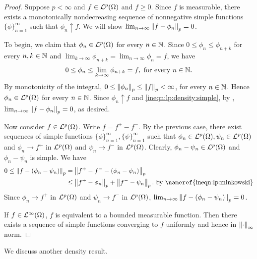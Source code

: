 \begin{proof}

Suppose $p < \infty$ and $f \in {\mathcal {L}^p}(\Omega)$ and $f \geq 0$. Since $f$ is measurable, there exists a monotonically nondecreasing sequence of nonnegative simple functions $\{ \phi \}_{n=1}^{\infty}$ such that $\phi_n \uparrow f$. We will show $\lim_{n \to \infty} \left\lVert f - \phi_n\right\rVert_p = 0$. 

To begin, we claim that $\phi_n \in {\mathcal {L}^p}(\Omega)$ for every $n \in {\mathbb N}$.
Since $0 \leq \phi_{n} \leq \phi_{n + k}$ for every $n, k \in {\mathbb N}$ and $\lim_{k \to \infty} \phi_{n + k} = \lim_{n \to \infty} \phi_n = f$, we have
\begin{align}
    \label{ineqn:lp:density:simple}
    0 \leq \phi_n \leq \lim_{k \to \infty} \phi_{n + k} = f, \text{ for every $n \in {\mathbb N}$.}
\end{align}
By monotonicity of the integral, $0 \leq \left\lVert\phi_n\right\rVert_p \leq \left\lVert f\right\rVert_p < \infty$, for every $n \in {\mathbb N}$.
Hence $\phi_n \in {\mathcal {L}^p}(\Omega)$ for every $n \in {\mathbb N}$. Since $\phi_n \uparrow f$ and \ref{ineqn:lp:density:simple}, by ,   $\lim_{n \to \infty} \left\lVert f - \phi_n\right\rVert_p = 0$, as desired.

Now consider $f \in {\mathcal {L}^p}(\Omega)$. Write $f = f^{+} - f^{-}$. By the previous case, there exist sequences of simple functions $\{ \phi \}_{n=1}^{\infty}, \{ \psi \}_{n=1}^{\infty}$ such that $\phi_n \in {\mathcal {L}^p}(\Omega), \psi_n \in {\mathcal {L}^p}(\Omega)$ and $\phi_n \rightarrow f^{+}$ in ${\mathcal {L}^p}(\Omega)$ and $\psi_n \rightarrow f^{-}$ in ${\mathcal {L}^p}(\Omega)$. Clearly, $\phi_n - \psi_n \in {\mathcal {L}^p}(\Omega)$ and $\phi_n - \psi_n$ is simple. We have
\begin{align*}
    0 \leq \norm{f - (\phi_n - \psi_n)}_p 
                                   &=\norm{f^{+} - f^{-} - (\phi_n - \psi_n)}_p \\
                                   &\leq \norm{f^{+} - \phi_n}_p + \norm{f^{-} - \psi_n}_p. \text{ by \nameref{ineqn:lp:minkowski}} 
\end{align*}
Since $\phi_n \rightarrow f^{+}$ in ${\mathcal {L}^p}(\Omega)$ and $\psi_n \rightarrow f^{-}$ in ${\mathcal {L}^p}(\Omega)$, $\lim_{n \to \infty} \left\lVert f - (\phi_n - \psi_n)\right\rVert_p = 0$.

If $f \in {\mathcal {L}^\infty}(\Omega)$, $f$ is equivalent to a bounded measurable function. Then there exists a sequence of simple functions converging to $f$ uniformly and hence in $\left\lVert\cdot\right\rVert_\infty$ norm.
\end{proof}

We discuss another density result.

